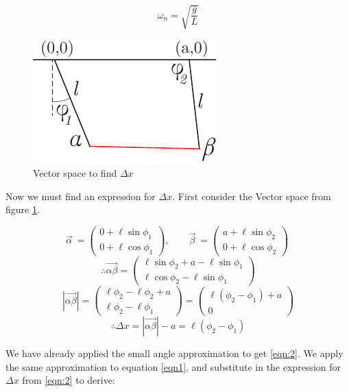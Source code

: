 \documentclass[aps,prl,reprint,10pt,amsmath,amssymb,superscriptaddress,a4paper, floatfix]{revtex4-2}
\begin{document}
\begin{equation}
    \omega_n = \sqrt{\frac{g}{L}}
\end{equation}

\begin{figure}[t]
    \includegraphics[width = 7 cm]{Asset 5.pdf}
    \caption{Vector space to find $\Delta x$}
    \label{fig:vectorspace1}
\end{figure}

Now we must find an expression for $\Delta x$. First consider the Vector space from figure \ref{fig:vectorspace1}.

\[
\vec{\alpha} \ = \begin{pmatrix} 0 + \ell \sin \phi_1 \\ 0 + \ell \cos \phi_1 \end{pmatrix}, \qquad
\vec{\beta} \ = \begin{pmatrix} a + \ell \sin \phi_2 \\ 0 + \ell \cos \phi_2 \end{pmatrix}\
\]\[
\therefore \overrightarrow{\alpha \beta} = \begin{pmatrix} \ell \sin \phi_2 + a - \ell \sin \phi_1 \\ \ell \cos \phi_2 - \ell \sin \phi_1 \end{pmatrix}
\]\[
|\overrightarrow{\alpha \beta}| = \begin{pmatrix}  \ell \phi_2 - \ell \phi_2 + a \\  \ell \phi_2 - \ell \phi_1 \end{pmatrix} = \begin{pmatrix}  \ell ( \phi_2 - \phi_1 ) + a \\  0 \end{pmatrix}
\] \begin{equation}
\therefore \Delta x = |\overrightarrow{\alpha \beta}| - a = \ell \left(\phi_2 - \phi_1\right)
\label{eqn:2}
\end{equation}

We have already applied the small angle approximation to get \ref{eqn:2}. We apply the same approximation to equation \ref{eqn1}, and substitute in the expression for $\Delta x$ from \ref{eqn:2} to derive:
\end{document}
